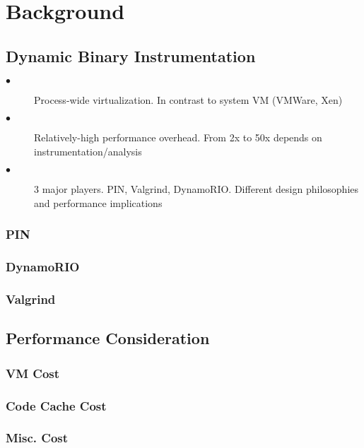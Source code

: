 \section{Background}
\label{sec:background}
\subsection{Dynamic Binary Instrumentation}
\begin{description}
  \item[$\bullet$] Process-wide virtualization. In contrast to system VM (VMWare, Xen)
  \item[$\bullet$] Relatively-high performance overhead. From 2x to 50x depends on instrumentation/analysis
  \item[$\bullet$] 3 major players. PIN, Valgrind, DynamoRIO. Different design philosophies and performance implications
\end{description}
\subsubsection{PIN}
\subsubsection{DynamoRIO}
\subsubsection{Valgrind}
\subsection{Performance Consideration}
\subsubsection{VM Cost}
\subsubsection{Code Cache Cost}
\subsubsection{Misc. Cost}
